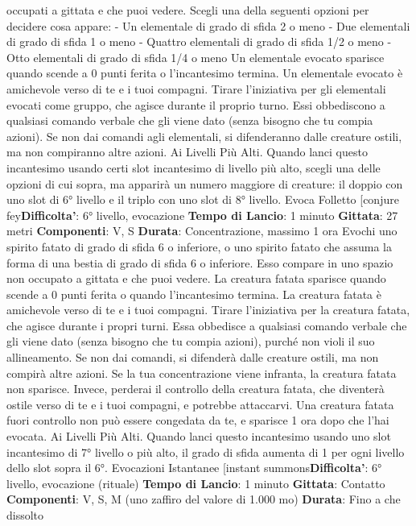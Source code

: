 \begin{multicols}{2}
occupati a gittata e che puoi vedere. Scegli una della
seguenti opzioni per decidere cosa appare:
- Un elementale di grado di sfida 2 o meno
- Due elementali di grado di sfida 1 o meno
- Quattro elementali di grado di sfida 1/2 o meno
- Otto elementali di grado di sfida 1/4 o meno
Un elementale evocato sparisce quando scende a 0
punti ferita o l’incantesimo termina.
Un elementale evocato è amichevole verso di te e i tuoi
compagni. Tirare l’iniziativa per gli elementali evocati
come gruppo, che agisce durante il proprio turno. Essi
obbediscono a qualsiasi comando verbale che gli viene
dato (senza bisogno che tu compia azioni). Se non dai
comandi agli elementali, si difenderanno dalle creature
ostili, ma non compiranno altre azioni.
Ai Livelli Più Alti. Quando lanci questo incantesimo
usando certi slot incantesimo di livello più alto, scegli
una delle opzioni di cui sopra, ma apparirà un numero
maggiore di creature: il doppio con uno slot di 6° livello
e il triplo con uno slot di 8° livello.
Evoca Folletto
[conjure fey\textbf{Difficolta'}:
6° livello, evocazione
\textbf{Tempo di Lancio}: 1 minuto
\textbf{Gittata}: 27 metri
\textbf{Componenti}: V, S
\textbf{Durata}: Concentrazione, massimo 1 ora
Evochi uno spirito fatato di grado di sfida 6 o inferiore, o
uno spirito fatato che assuma la forma di una bestia di
grado di sfida 6 o inferiore. Esso compare in uno spazio
non occupato a gittata e che puoi vedere. La creatura
fatata sparisce quando scende a 0 punti ferita o quando
l’incantesimo termina.
La creatura fatata è amichevole verso di te e i tuoi
compagni. Tirare l’iniziativa per la creatura fatata, che
agisce durante i propri turni. Essa obbedisce a qualsiasi
comando verbale che gli viene dato (senza bisogno che
tu compia azioni), purché non violi il suo allineamento.
Se non dai comandi, si difenderà dalle creature ostili,
ma non compirà altre azioni.
Se la tua concentrazione viene infranta, la creatura
fatata non sparisce. Invece, perderai il controllo della
creatura fatata, che diventerà ostile verso di te e i tuoi
compagni, e potrebbe attaccarvi. Una creatura fatata
fuori controllo non può essere congedata da te, e
sparisce 1 ora dopo che l’hai evocata.
Ai Livelli Più Alti. Quando lanci questo incantesimo
usando uno slot incantesimo di 7° livello o più alto, il
grado di sfida aumenta di 1 per ogni livello dello slot
sopra il 6°.
Evocazioni Istantanee
[instant summons\textbf{Difficolta'}:
6° livello, evocazione (rituale)
\textbf{Tempo di Lancio}: 1 minuto
\textbf{Gittata}: Contatto
\textbf{Componenti}: V, S, M (uno zaffiro del valore di 1.000
mo)
\textbf{Durata}: Fino a che dissolto

\end{multicols}
